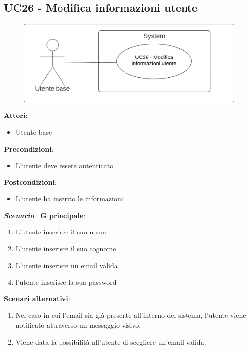 \subsection{UC26 - Modifica informazioni utente}\label{usecase:26}
\begin{figure}[H]
\centering
\includegraphics[width=0.75\linewidth]{ucd/UCD26}
\end{figure}
\textbf{Attori}:
\begin{itemize}
    \item Utente base
\end{itemize}
\textbf{Precondizioni}:
\begin{itemize}
    \item L'utente deve essere autenticato
\end{itemize}
\textbf{Postcondizioni}:
\begin{itemize}
    \item L'utente ha inserito le informazioni
\end{itemize}
\textbf{\textit{Scenario}_G principale}:
\begin{enumerate}
    \item L'utente inserisce il suo nome
    \item L'utente inserisce il suo cognome
    \item L'utente inserisce un email valida
    \item l'utente inserisce la sua password
\end{enumerate}
\textbf{Scenari alternativi}:
\begin{enumerate}
    \item Nel caso in cui l'email sia già presente all'interno del sistema, l'utente viene notificato attraverso un messaggio visivo.
    \item Viene data la possibilità all'utente di scegliere un'email valida.
\end{enumerate}
\newpage